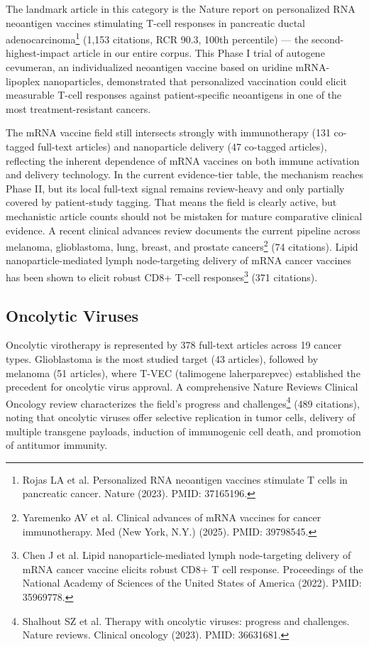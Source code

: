 \documentclass[11pt,twoside,openright]{report}
\begin{document}
The landmark article in this category is the Nature report on personalized RNA neoantigen vaccines stimulating T-cell responses in pancreatic ductal adenocarcinoma\footnote{Rojas LA et al. Personalized RNA neoantigen vaccines stimulate T cells in pancreatic cancer. Nature (2023). PMID: 37165196.} (1,153 citations, RCR 90.3, 100th percentile) --- the second-highest-impact article in our entire corpus. This Phase I trial of autogene cevumeran, an individualized neoantigen vaccine based on uridine mRNA-lipoplex nanoparticles, demonstrated that personalized vaccination could elicit measurable T-cell responses against patient-specific neoantigens in one of the most treatment-resistant cancers.

The mRNA vaccine field still intersects strongly with immunotherapy (131 co-tagged full-text articles) and nanoparticle delivery (47 co-tagged articles), reflecting the inherent dependence of mRNA vaccines on both immune activation and delivery technology. In the current evidence-tier table, the mechanism reaches Phase II, but its local full-text signal remains review-heavy and only partially covered by patient-study tagging. That means the field is clearly active, but mechanistic article counts should not be mistaken for mature comparative clinical evidence. A recent clinical advances review documents the current pipeline across melanoma, glioblastoma, lung, breast, and prostate cancers\footnote{Yaremenko AV et al. Clinical advances of mRNA vaccines for cancer immunotherapy. Med (New York, N.Y.) (2025). PMID: 39798545.} (74 citations). Lipid nanoparticle-mediated lymph node-targeting delivery of mRNA cancer vaccines has been shown to elicit robust CD8+ T-cell responses\footnote{Chen J et al. Lipid nanoparticle-mediated lymph node-targeting delivery of mRNA cancer vaccine elicits robust CD8+ T cell response. Proceedings of the National Academy of Sciences of the United States of America (2022). PMID: 35969778.} (371 citations).

\subsection{Oncolytic Viruses}

Oncolytic virotherapy is represented by 378 full-text articles across 19 cancer types. Glioblastoma is the most studied target (43 articles), followed by melanoma (51 articles), where T-VEC (talimogene laherparepvec) established the precedent for oncolytic virus approval. A comprehensive Nature Reviews Clinical Oncology review characterizes the field's progress and challenges\footnote{Shalhout SZ et al. Therapy with oncolytic viruses: progress and challenges. Nature reviews. Clinical oncology (2023). PMID: 36631681.} (489 citations), noting that oncolytic viruses offer selective replication in tumor cells, delivery of multiple transgene payloads, induction of immunogenic cell death, and promotion of antitumor immunity.
\end{document}
